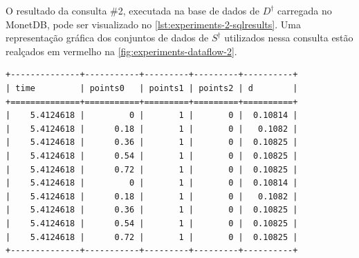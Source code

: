 O resultado da consulta \#2, executada na base de dados de \(D^{\dagger}\) carregada no MonetDB, pode ser visualizado no \autoref{lst:experiments-2-sqlresults}. Uma representação gráfica dos conjuntos de dados de \(S^{\dagger}\) utilizados nessa consulta estão realçados em vermelho na \autoref{fig:experiments-dataflow-2}.

\begin{lstlisting}[language=sqlresults,label={lst:experiments-2-sqlresults},caption={[Resultados da consulta \#2.]Resultados da consulta \#2 (10 tuplas, tempo médio: 5,92~ms).}]
+--------------+-----------+---------+---------+----------+
| time         | points0   | points1 | points2 | d        |
+==============+===========+=========+=========+==========+
|    5.4124618 |         0 |       1 |       0 |  0.10814 |
|    5.4124618 |      0.18 |       1 |       0 |   0.1082 |
|    5.4124618 |      0.36 |       1 |       0 |  0.10825 |
|    5.4124618 |      0.54 |       1 |       0 |  0.10825 |
|    5.4124618 |      0.72 |       1 |       0 |  0.10825 |
|    5.4124618 |         0 |       1 |       0 |  0.10814 |
|    5.4124618 |      0.18 |       1 |       0 |   0.1082 |
|    5.4124618 |      0.36 |       1 |       0 |  0.10825 |
|    5.4124618 |      0.54 |       1 |       0 |  0.10825 |
|    5.4124618 |      0.72 |       1 |       0 |  0.10825 |
+--------------+-----------+---------+---------+----------+
\end{lstlisting}

